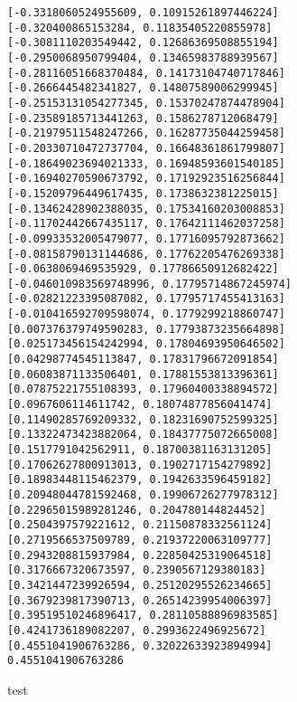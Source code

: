\documentclass[12pt,a4paper]{article}
\begin{document}
\begin{lstlisting}
[-0.3318060524955609, 0.10915261897446224]
[-0.320400865153284, 0.11835405220855978]
[-0.3081110203549442, 0.12686369508855194]
[-0.2950068950799404, 0.13465983788939567]
[-0.28116051668370484, 0.14173104740717846]
[-0.2666445482341827, 0.14807589006299945]
[-0.25153131054277345, 0.15370247874478904]
[-0.23589185713441263, 0.1586278712068479]
[-0.21979511548247266, 0.16287735044259458]
[-0.20330710472737704, 0.16648361861799807]
[-0.18649023694021333, 0.16948593601540185]
[-0.16940270590673792, 0.17192923516256844]
[-0.15209796449617435, 0.1738632381225015]
[-0.13462428902388035, 0.17534160203008853]
[-0.11702442667435117, 0.17642111462037258]
[-0.09933532005479077, 0.17716095792873662]
[-0.08158790131144686, 0.17762205476269338]
[-0.0638069469535929, 0.17786650912682422]
[-0.046010983569748996, 0.17795714867245974]
[-0.02821223395087082, 0.17795717455413163]
[-0.010416592709598074, 0.1779299218860747]
[0.007376379749590283, 0.17793873235664898]
[0.025173456154242994, 0.17804693950646502]
[0.04298774545113847, 0.17831796672091854]
[0.06083871133506401, 0.17881553813396361]
[0.07875221755108393, 0.17960400338894572]
[0.0967606114611742, 0.18074877856041474]
[0.11490285769209332, 0.18231690752599325]
[0.13322473423882064, 0.18437775072665008]
[0.1517791042562911, 0.18700381163131205]
[0.17062627800913013, 0.1902717154279892]
[0.18983448115462379, 0.1942633596459182]
[0.20948044781592468, 0.19906726277978312]
[0.22965015989281246, 0.204780144824452]
[0.2504397579221612, 0.21150878332561124]
[0.2719566537509789, 0.21937220063109777]
[0.2943208815937984, 0.22850425319064518]
[0.3176667320673597, 0.2390567129380183]
[0.3421447239926594, 0.25120295526234665]
[0.3679239817390713, 0.26514239954006397]
[0.39519510246896417, 0.28110588896983585]
[0.4241736189082207, 0.2993622496925672]
[0.4551041906763286, 0.32022633923894994]
0.4551041906763286
\end{lstlisting}


test


\begin{lstlisting}

\end{lstlisting}
\end{document}
